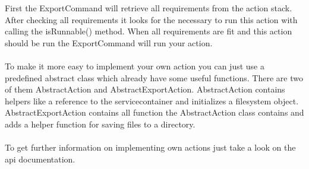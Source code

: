 \noindent
First the ExportCommand will retrieve all requirements from the action stack. After checking all requirements it looks for the necessary to run this action with calling the isRunnable() method. When all requirements are fit and this action should be run the ExportCommand will run your action.\\
\\
To make it more easy to implement your own action you can just use a predefined abstract class which already have some useful functions. There are two of them AbstractAction and AbstractExportAction. AbstractAction contains helpers like a reference to the servicecontainer and initializes a filesystem object. AbstractExportAction contains all function the AbstractAction class contains and adds a helper function for saving files to a directory. \\
\\
To get further information on implementing own actions just take a look on the api documentation.\\